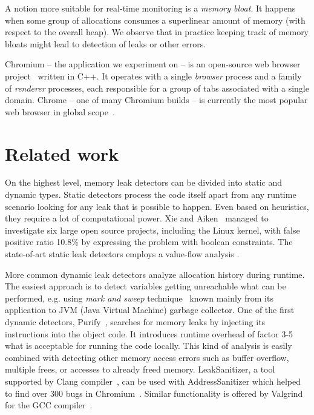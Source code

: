 \documentclass[preprint, numbers]{sigplanconf}
\begin{document}
A notion more suitable for real-time monitoring is a \textit{memory bloat}.
It happens when some group of allocations consumes a superlinear amount of memory
(with respect to the overall heap).
We observe that in practice keeping track of memory bloats might lead to detection
of leaks or other errors.

Chromium -- the application we experiment on -- is an open-source web browser project~\cite{chromium} written in C++.
It operates with a single \textit{browser} process and a family
of \textit{renderer} processes, each responsible for a group
of tabs associated with a single domain.
Chrome -- one of many Chromium builds -- is currently the most popular web browser in global scope~\cite{wikimedia}.

\section{Related work}

On the highest level, memory leak detectors can be divided into static
and dynamic types.
Static detectors process the code itself apart from any runtime scenario
looking for any leak that is possible to happen.
Even based on heuristics, they require a lot of computational power.
Xie and Aiken~\cite{boolean} managed to investigate six large open source
projects, including the Linux kernel, with false positive ratio 10.8\%
by expressing the problem with boolean constraints.
The state-of-art static leak detectors employs a value-flow
analysis \cite{flow, saber}.

More common dynamic leak detectors analyze allocation history during runtime.
The easiest approach is to detect variables getting unreachable
what can be performed, e.g. using \textit{mark and sweep} technique~\cite{mark-and-sweep}
known mainly from its application to JVM (Java Virtual Machine) garbage collector.
One of the first dynamic detectors, Purify~\cite{purify}, searches for memory leaks by injecting its instructions
into the object code.
It introduces runtime overhead of factor 3-5 what is acceptable for running
the code locally.
This kind of analysis is easily combined with detecting other memory access errors
such as buffer overflow, multiple frees, or accesses to already freed memory.
LeakSanitizer, a tool supported by Clang compiler~\cite{leak-san}, can be used with AddressSanitizer
which helped to find over 300 bugs in Chromium~\cite{address}.
Similar functionality is offered by Valgrind for the GCC compiler~\cite{valgrind}.
\end{document}
